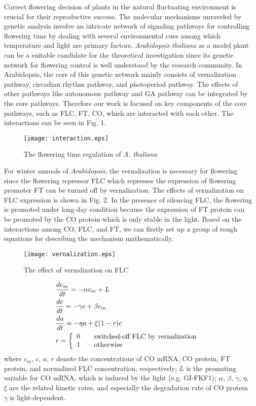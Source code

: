 \documentclass[paper=a4, fontsize=12pt]{scrartcl}	%
\numberwithin{equation}{section}					%
\numberwithin{figure}{section}					%
\numberwithin{table}{section}					%
\begin{document}
Correct flowering decision of plants in the natural fluctuating environment is crucial for their reproductive success. The molecular mechanisms unraveled by genetic analysis involve an intricate network of signaling pathways for controlling flowering time by dealing with several environmental cues among which temperature and light are primary factors. {\it Arabidopsis thaliana} as a model plant can be a suitable candidate for the theoretical investigation since its genetic network for flowering control is well understood by the research community. In Arabidopsis, the core of this genetic network mainly consists of vernalization pathway, circadian rhythm pathway, and photoperiod pathway. The effects of other pathways like autonomous pathway and GA pathway can be integrated by the core pathways. Therefore our work is focused on key components of the core pathways, such as FLC, FT, CO, which are interacted with each other. The interactions\cite{coupland2012} can be seen in Fig. 1. 
\begin{figure}
\centering
\texttt{[image: interaction.eps]}
\caption{The flowering time regulation of {\it A. thaliana}}
\end{figure}

For winter annuals of {\it Arabidopsis}, the vernalization is necessary for flowering since the flowering repressor FLC which represses the expression of flowering promoter FT can be turned off by vernalization.  The effects of vernalization on FLC expression is shown in Fig. 2. In the presence of silencing FLC, the flowering is promoted under long-day condition  because the expression of FT protein can be promoted by the CO protein which is only stable in the light. Based on the interactions among CO, FLC, and FT, we can firstly set up a group of rough equations for describing the mechanism mathematically. 

\begin{figure}
\centering
\texttt{[image: vernalization.eps]}
\caption{The effect of vernalization on FLC}
\end{figure}
\begin{align}
\nonumber &\frac{dc_m}{dt}=-\alpha c_m+L\\
\nonumber &\frac{dc}{dt}=-\gamma c+\beta c_m \\
\nonumber &\frac{da}{dt}=-\eta a+\xi (1-r)c\\
\nonumber &r=\left\{ \begin{array}{l l}
0 &\quad \text{switched-off FLC by vernalization}\\
1 &\quad \text{otherwise}
\end{array} \right.
\end{align}
where $c_m$, $c$, $a$, $r$ denote the concentrations of CO mRNA, CO protein, FT protein, and normalized FLC concentration, respectively; $L$ is the promoting variable for CO mRNA, which is induced by the light (e.g. GI-FKF1); $\alpha$, $\beta$, $\gamma$, $\eta$, $\xi$ are the related kinetic rates, and especially the degradation rate  of CO protein $\gamma$ is light-dependent. 
\end{document}
